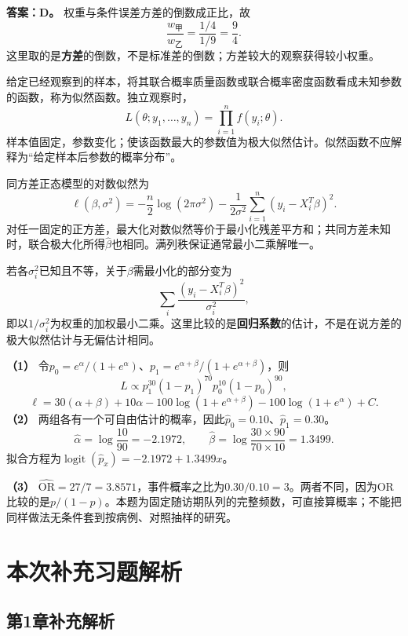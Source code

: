 
\textbf{答案：D。} 权重与条件误差方差的倒数成正比，故
\[\frac{w_{\text{甲}}}{w_{\text{乙}}}=\frac{1/4}{1/9}=\frac94.\]
这里取的是\textbf{方差}的倒数，不是标准差的倒数；方差较大的观察获得较小权重。




给定已经观察到的样本，将其联合概率质量函数或联合概率密度函数看成未知参数的函数，称为似然函数。独立观察时，
\[L(\theta;y_1,\ldots,y_n)=\prod_{i=1}^{n}f(y_i;\theta).\]
样本值固定，参数变化；使该函数最大的参数值为极大似然估计。似然函数不应解释为“给定样本后参数的概率分布”。




同方差正态模型的对数似然为
\[\ell(\beta,\sigma^2)=-\frac n2\log(2\pi\sigma^2)
-\frac{1}{2\sigma^2}\sum_{i=1}^{n}(y_i-X_i^T\beta)^2.\]
对任一固定的正方差，最大化对数似然等价于最小化残差平方和；共同方差未知时，联合极大化所得\(\hat\beta\)也相同。满列秩保证通常最小二乘解唯一。

若各\(\sigma_i^2\)已知且不等，关于\(\beta\)需最小化的部分变为
\[\sum_i\frac{(y_i-X_i^T\beta)^2}{\sigma_i^2},\]
即以\(1/\sigma_i^2\)为权重的加权最小二乘。这里比较的是\textbf{回归系数}的估计，不是在说方差的极大似然估计与无偏估计相同。




\textbf{（1）} 令\(p_0=e^\alpha/(1+e^\alpha)\)、\(p_1=e^{\alpha+\beta}/(1+e^{\alpha+\beta})\)，则
\[L\propto p_1^{30}(1-p_1)^{70}p_0^{10}(1-p_0)^{90},\]
\[\ell=30(\alpha+\beta)+10\alpha
-100\log(1+e^{\alpha+\beta})-100\log(1+e^\alpha)+C.\]
\textbf{（2）} 两组各有一个可自由估计的概率，因此\(\hat p_0=0.10\)、\(\hat p_1=0.30\)。
\[\hat\alpha=\log\frac{10}{90}=-2.1972,\qquad
\hat\beta=\log\frac{30\times90}{70\times10}=1.3499.\]
拟合方程为\(\operatorname{logit}(\hat p_x)=-2.1972+1.3499x\)。

\textbf{（3）} \(\widehat{\mathrm{OR}}=27/7=3.8571\)，事件概率之比为\(0.30/0.10=3\)。两者不同，因为OR比较的是\(p/(1-p)\)。本题为固定随访期队列的完整频数，可直接算概率；不能把同样做法无条件套到按病例、对照抽样的研究。
\clearpage\section{本次补充习题解析}
\subsection*{第1章补充解析}

\EndExercises
